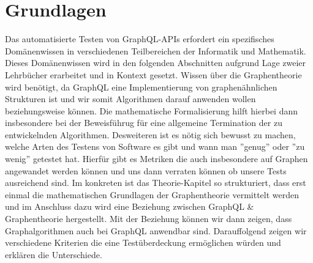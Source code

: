 \chapter{Grundlagen}

Das automatisierte Testen von GraphQL-APIs erfordert ein spezifisches Domänenwissen in verschiedenen Teilbereichen der
Informatik und Mathematik.
Dieses Domänenwissen wird in den folgenden Abschnitten aufgrund Lage zweier Lehrbücher erarbeitet
und in Kontext gesetzt.
Wissen über die Graphentheorie wird benötigt, da GraphQL eine Implementierung von graphenähnlichen Strukturen
ist und wir somit Algorithmen darauf anwenden wollen beziehungsweise können.
Die mathematische Formalisierung hilft hierbei dann insbesondere
bei der Beweisführug für eine allgemeine Termination der zu entwickelnden Algorithmen.
Desweiteren ist es nötig sich bewusst zu machen, welche Arten des Testens von Software es gibt und wann man ''genug'' oder ''zu wenig'' getestet hat.
Hierfür gibt es Metriken die auch insbesondere auf Graphen angewandet werden können und uns dann verraten können ob unsere Tests ausreichend sind.
Im konkreten ist das Theorie-Kapitel so strukturiert, dass erst einmal die mathematischen Grundlagen der Graphentheorie
vermittelt werden und im Anschluss dazu wird eine Beziehung zwischen GraphQL \& Graphentheorie hergestellt.
Mit der Beziehung können wir dann zeigen, dass Graphalgorithmen auch bei GraphQL anwendbar sind.
Darauffolgend zeigen wir verschiedene Kriterien die eine Testüberdeckung ermöglichen würden und erklären die Unterschiede.